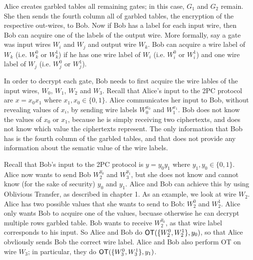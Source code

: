 Alice creates garbled tables all remaining gates; in this case, $G_1$ and $G_2$ remain.
She then sends the fourth column all of garbled tables, the encryption of the respective out-wires, to Bob.
Now if Bob has a label for each input wire, then Bob can acquire one of the labels of the output wire.
More formally, say a gate was input wires $W_i$ and $W_j$ and output wire $W_k$.
Bob can acquire a wire label of $W_k$ (i.e. $W_k^0$ or $W_k^1$) if he has one wire label of $W_i$ (i.e. $W_i^0$ or $W_i^1$) and one wire label of $W_j$ (i.e. $W_j^0$ or $W_j^1$).

In order to decrypt each gate, Bob needs to first acquire the wire lables of the input wires, $W_0$, $W_1$, $W_2$ and $W_3$.
Recall that Alice's input to the 2PC protocol are $x = x_0x_1$ where $x_1, x_0 \in \{0,1\}$.
Alice communicates her input to Bob, without revealing values of $x_i$, by sending wire labels $W_0^{x_0}$ and $W_1^{x_1}$.
Bob does not know the values of $x_0$ or $x_1$, because he is simply receiving two ciphertexts, and does not know which value the ciphertexts represent.
The only information that Bob has is the fourth column of the garbled tables, and that does not provide any information about the sematic value of the wire labels.

Recall that Bob's input to the 2PC protocol is $y = y_0 y_1$ where $y_1, y_0 \in \{0,1\}$.
Alice now wants to send Bob $W_2^{y_0}$ and $W_3^{y_1}$, but she does not know and cannot know (for the sake of security) $y_0$ and $y_1$.
Alice and Bob can achieve this by using Oblivious Transfer, as described in chapter 1.
As an example, we look at wire $W_2$.
Alice has two possible values that she wants to send to Bob: $W_2^0$ and $W_2^1$.
Alice only wants Bob to acquire one of the values, becuase otherwise he can decrypt multiple rows garbled table.
Bob wants to receive $W_2^{y_0}$, as that wire label corresponds to his input.
So Alice and Bob do $\textsf{OT}(\{W_2^0, W_2^1\}, y_0)$, so that Alice obvliously sends Bob the correct wire label.
Alice and Bob also perform OT on wire $W_3$; in particular, they do $\textsf{OT}(\{W_3^0, W_3^1\}, y_1)$.

